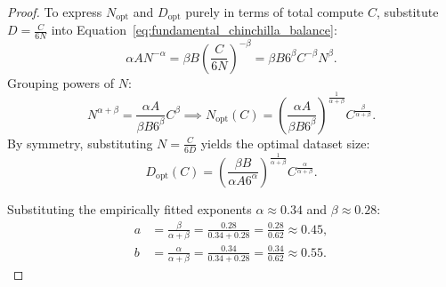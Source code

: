 \documentclass[../../main.tex]{subfiles}
\begin{document}
\begin{proof}
To express $N_{\text{opt}}$ and $D_{\text{opt}}$ purely in terms of total compute $C$, substitute $D = \frac{C}{6N}$ into Equation~\eqref{eq:fundamental_chinchilla_balance}:
\begin{equation}
\alpha A N^{-\alpha} = \beta B \left( \frac{C}{6N} \right)^{-\beta} = \beta B 6^\beta C^{-\beta} N^\beta.
\end{equation}
Grouping powers of $N$:
\begin{equation}
N^{\alpha + \beta} = \frac{\alpha A}{\beta B 6^\beta} C^\beta \implies N_{\text{opt}}(C) = \left( \frac{\alpha A}{\beta B 6^\beta} \right)^{\frac{1}{\alpha + \beta}} C^{\frac{\beta}{\alpha + \beta}}.
\end{equation}
By symmetry, substituting $N = \frac{C}{6D}$ yields the optimal dataset size:
\begin{equation}
D_{\text{opt}}(C) = \left( \frac{\beta B}{\alpha A 6^\alpha} \right)^{\frac{1}{\alpha + \beta}} C^{\frac{\alpha}{\alpha + \beta}}.
\end{equation}

Substituting the empirically fitted exponents $\alpha \approx 0.34$ and $\beta \approx 0.28$:
\begin{align}
a &= \frac{\beta}{\alpha + \beta} = \frac{0.28}{0.34 + 0.28} = \frac{0.28}{0.62} \approx 0.45, \\
b &= \frac{\alpha}{\alpha + \beta} = \frac{0.34}{0.34 + 0.28} = \frac{0.34}{0.62} \approx 0.55.
\end{align}
\end{proof}
\end{document}
